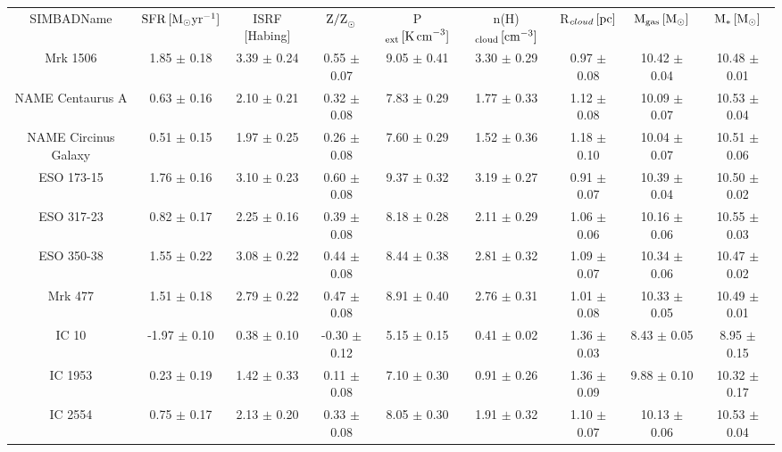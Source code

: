 \begin{table}
\begin{tabular}{ccccccccc}
SIMBADName & $\rm{SFR}\, [\rm{M}_{\odot} \rm{yr}^{-1}]$ & ISRF [Habing] & $\rm{Z/Z}_{\odot}$ & P$_{\rm{ext}}\, [\rm{K\, cm}^{-3}]$ & n(H)$_{\rm{cloud}}\, [\rm{cm}^{-3}]$ & R$_{cloud}\, [\rm{pc}]$ & $\rm{M}_{\rm{gas}}\, [\rm{M}_{\odot}]$ & $\rm{M}_{\ast}\, [\rm{M}_{\odot}]$ \\
Mrk 1506 & 1.85 $\pm$ 0.18 & 3.39 $\pm$ 0.24 & 0.55 $\pm$ 0.07 & 9.05 $\pm$ 0.41 & 3.30 $\pm$ 0.29 & 0.97 $\pm$ 0.08 & 10.42 $\pm$ 0.04 & 10.48 $\pm$ 0.01 \\
NAME Centaurus A & 0.63 $\pm$ 0.16 & 2.10 $\pm$ 0.21 & 0.32 $\pm$ 0.08 & 7.83 $\pm$ 0.29 & 1.77 $\pm$ 0.33 & 1.12 $\pm$ 0.08 & 10.09 $\pm$ 0.07 & 10.53 $\pm$ 0.04 \\
NAME Circinus Galaxy & 0.51 $\pm$ 0.15 & 1.97 $\pm$ 0.25 & 0.26 $\pm$ 0.08 & 7.60 $\pm$ 0.29 & 1.52 $\pm$ 0.36 & 1.18 $\pm$ 0.10 & 10.04 $\pm$ 0.07 & 10.51 $\pm$ 0.06 \\
ESO 173-15 & 1.76 $\pm$ 0.16 & 3.10 $\pm$ 0.23 & 0.60 $\pm$ 0.08 & 9.37 $\pm$ 0.32 & 3.19 $\pm$ 0.27 & 0.91 $\pm$ 0.07 & 10.39 $\pm$ 0.04 & 10.50 $\pm$ 0.02 \\
ESO 317-23 & 0.82 $\pm$ 0.17 & 2.25 $\pm$ 0.16 & 0.39 $\pm$ 0.08 & 8.18 $\pm$ 0.28 & 2.11 $\pm$ 0.29 & 1.06 $\pm$ 0.06 & 10.16 $\pm$ 0.06 & 10.55 $\pm$ 0.03 \\
ESO 350-38 & 1.55 $\pm$ 0.22 & 3.08 $\pm$ 0.22 & 0.44 $\pm$ 0.08 & 8.44 $\pm$ 0.38 & 2.81 $\pm$ 0.32 & 1.09 $\pm$ 0.07 & 10.34 $\pm$ 0.06 & 10.47 $\pm$ 0.02 \\
Mrk  477 & 1.51 $\pm$ 0.18 & 2.79 $\pm$ 0.22 & 0.47 $\pm$ 0.08 & 8.91 $\pm$ 0.40 & 2.76 $\pm$ 0.31 & 1.01 $\pm$ 0.08 & 10.33 $\pm$ 0.05 & 10.49 $\pm$ 0.01 \\
IC   10 & -1.97 $\pm$ 0.10 & 0.38 $\pm$ 0.10 & -0.30 $\pm$ 0.12 & 5.15 $\pm$ 0.15 & 0.41 $\pm$ 0.02 & 1.36 $\pm$ 0.03 & 8.43 $\pm$ 0.05 & 8.95 $\pm$ 0.15 \\
IC 1953 & 0.23 $\pm$ 0.19 & 1.42 $\pm$ 0.33 & 0.11 $\pm$ 0.08 & 7.10 $\pm$ 0.30 & 0.91 $\pm$ 0.26 & 1.36 $\pm$ 0.09 & 9.88 $\pm$ 0.10 & 10.32 $\pm$ 0.17 \\
IC 2554 & 0.75 $\pm$ 0.17 & 2.13 $\pm$ 0.20 & 0.33 $\pm$ 0.08 & 8.05 $\pm$ 0.30 & 1.91 $\pm$ 0.32 & 1.10 $\pm$ 0.07 & 10.13 $\pm$ 0.06 & 10.53 $\pm$ 0.04 \\
\end{tabular}
\end{table}

